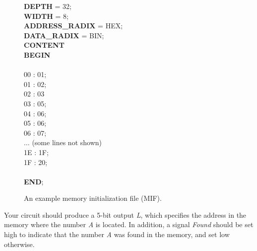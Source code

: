 \documentclass[epsfig,10pt,fullpage]{article}
\begin{document}
\begin{figure}[H]
\begin{center}
\begin{minipage}[t]{12.5 cm}
\begin{tabbing}
{\bf DEPTH} = 32;\\
{\bf WIDTH} = 8;\\
{\bf ADDRESS\_RADIX} = HEX;\\
{\bf DATA\_RADIX} = BIN;\\
{\bf CONTENT}\\
{\bf BEGIN}\\
\\
00	:	01;\\
01	:	02;\\
02	:	03\\
03	:	05;\\
04	:	06;\\
05	:	06;\\
06	:	07;\\
$\ldots$ (some lines not shown)\\
1E :	1F;\\
1F :	20;\\
\\
{\bf END};\\
\end{tabbing}
\end{minipage}
\end{center}
\caption{An example memory initialization file (MIF).}
\label{fig:fig_MIF}
\end{figure}

Your circuit should produce a 5-bit output {\it L}, which specifies the address in the memory 
where the number {\it A} is located. In addition, a signal
{\it Found} should be set high to indicate that the number {\it A} was found in the memory, 
and set low otherwise.
\end{document}
